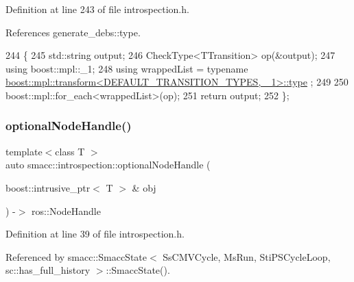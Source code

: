 Definition at line 243 of file introspection.\+h.



References generate\+\_\+debs\+::type.


\begin{DoxyCode}
244 \{
245     std::string output;
246     CheckType<TTransition> op(&output);
247     \textcolor{keyword}{using} boost::mpl::\_1;
248     \textcolor{keyword}{using} wrappedList = \textcolor{keyword}{typename} 
      \hyperlink{namespacegenerate__debs_a50bc9a7ecac9584553e089a448bcde58}{boost::mpl::transform<DEFAULT\_TRANSITION\_TYPES, \_1>::type}
      ;
249 
250     boost::mpl::for\_each<wrappedList>(op);
251     \textcolor{keywordflow}{return} output;
252 \};
\end{DoxyCode}
\mbox{\label{namespacesmacc_1_1introspection_a8acc3b4146a8b2bb0a9fa4178840e9b9}} 
\subsubsection{\texorpdfstring{optional\+Node\+Handle()}{optionalNodeHandle()}\hspace{0.1cm}{\footnotesize\ttfamily [1/2]}}
{\footnotesize\ttfamily template$<$class T $>$ \\
auto smacc\+::introspection\+::optional\+Node\+Handle (\begin{DoxyParamCaption}\item[{boost\+::intrusive\+\_\+ptr$<$ T $>$ \&}]{obj }\end{DoxyParamCaption}) -\/$>$ ros\+::\+Node\+Handle
}



Definition at line 39 of file introspection.\+h.



Referenced by smacc\+::\+Smacc\+State$<$ Ss\+C\+M\+V\+Cycle, Ms\+Run, Sti\+P\+S\+Cycle\+Loop, sc\+::has\+\_\+full\+\_\+history $>$\+::\+Smacc\+State().


